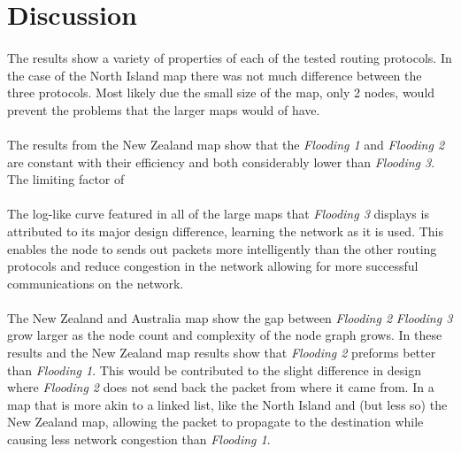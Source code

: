 \documentclass[11pt]{article}
\begin{document}
\section{Discussion}\label{discussion}

\paragraph{}
The results show a variety of properties of each of the tested routing
protocols. In the case of the North Island map there was not much difference
between the three protocols. Most likely due the small size of the map, only 2 nodes,
would prevent the problems that the larger maps would of have.


\paragraph{}
The results from the New Zealand map show that the \emph{Flooding 1} and
\emph{Flooding 2} are constant with their efficiency and both considerably
lower than \emph{Flooding 3}. The limiting factor of

\paragraph{}
The log-like curve featured in all of the large maps that \emph{Flooding 3}
displays is attributed to its major design difference, learning the network as
it is used. This enables the node to sends out packets more intelligently
than the other routing protocols and reduce congestion in the network allowing
for more successful communications on the network.

\paragraph{}
The New Zealand and Australia map show the gap between \emph{Flooding 2}
\emph{Flooding 3} grow larger as the node count and complexity of the node
graph grows. In these results and the New Zealand map results show that
\emph{Flooding 2} preforms better than \emph{Flooding 1}. This would be
contributed to the slight difference in design where \emph{Flooding 2} does not
send back the packet from where it came from. In a map that is more akin to a
linked list, like the North Island and (but less so) the New Zealand map,
allowing the packet to propagate to the destination while causing less
network congestion than \emph{Flooding 1}.
\end{document}
